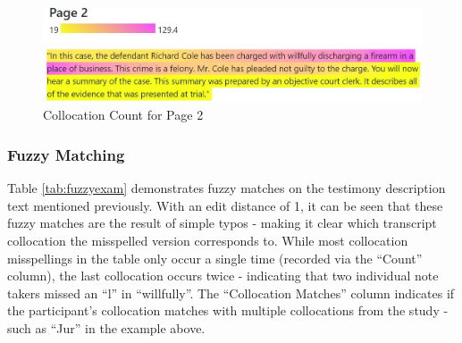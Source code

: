 \documentclass[print]{nuthesis}
\begin{document}
\begin{figure}

{\centering \includegraphics[width=\linewidth]{images/collocationanalysis} 

}

\caption{Collocation Count for Page 2}\label{fig:highlights}
\end{figure}

\hypertarget{fuzzy-matching-1}{%
\subsubsection{Fuzzy Matching}\label{fuzzy-matching-1}}

Table \ref{tab:fuzzyexam} demonstrates fuzzy matches on the testimony description text mentioned previously.
With an edit distance of 1, it can be seen that these fuzzy matches are the result of simple typos - making it clear which transcript collocation the misspelled version corresponds to.
While most collocation misspellings in the table only occur a single time (recorded via the ``Count'' column), the last collocation occurs twice - indicating that two individual note takers missed an ``l'' in ``willfully''.
The ``Collocation Matches'' column indicates if the participant's collocation matches with multiple collocations from the study - such as ``Jur'' in the example above.
\end{document}
